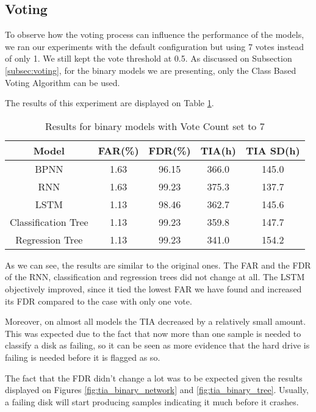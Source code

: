 \subsection{Voting}

To observe how the voting process can influence the performance of the models, we ran our experiments with the default configuration but using 7 votes instead of only 1.
We still kept the vote threshold at 0.5.
As discussed on Subsection \ref{subsec:voting}, for the binary models we are presenting, only the Class Based Voting Algorithm can be used.

The results of this experiment are displayed on Table \ref{table:results_binary_voting}. 

\begin{table}
  \begin{center}
    \begin{tabular}{|c|c|c|c|c|}
      \hline
    Model & FAR(\%) & FDR(\%) & TIA(h) & TIA SD(h) \\
    \hline
    BPNN & 1.63 & 96.15 & 366.0 & 145.0 \\
    RNN & 1.63 & 99.23 & 375.3 & 137.7 \\
    LSTM & 1.13 & 98.46 & 362.7 & 145.6\\
    Classification Tree & 1.13 & 99.23 & 359.8 & 147.7 \\
    Regression Tree & 1.13 & 99.23 & 341.0 & 154.2 \\
    \hline
    \end{tabular}
    \caption[Results Binary Models with Voting]{Results for binary models with Vote Count set to 7}
    \label{table:results_binary_voting}
  \end{center}
\end{table}

As we can see, the results are similar to the original ones.
The FAR and the FDR of the RNN, classification and regression trees did not change at all.
The LSTM objectively improved, since it tied the lowest FAR we have found and increased its FDR compared to the case with only one vote. 

Moreover, on almost all models the TIA decreased by a relatively small amount.
This was expected due to the fact that now more than one sample is needed to classify a disk as failing, so it can be seen as more evidence that the hard drive is failing is needed before it is flagged as so.

The fact that the FDR didn't change a lot was to be expected given the results displayed on Figures \ref{fig:tia_binary_network} and \ref{fig:tia_binary_tree}.
Usually, a failing disk will start producing samples indicating it much before it crashes.

